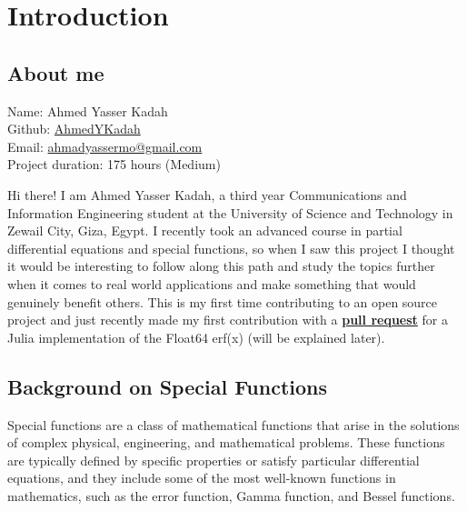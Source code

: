 \documentclass{article}
\theoremstyle{mytheoremstyle}
\theoremstyle{mytheoremstyle}
\theoremstyle{myproblemstyle}
\begin{document}
  \section*{Introduction}
    \subsection*{About me 
      \href{https://github.com/AhmedYKadah}{\faGithub}    
      \href{https://linkedin.com/in/ahmed-yasser-kadah-83687b269}{\faLinkedin}    
      \href{mailto:ahmadyassermo@gmail.com}{\faEnvelope[regular]}    
    }\label{sub:About} 
    Name: Ahmed Yasser Kadah
    \\Github: \href{https://github.com/AhmedYKadah}{AhmedYKadah}
    \\Email: \href{mailto:ahmadyassermo@gmail.com}{ahmadyassermo@gmail.com}    
    \\Project duration: 175 hours (Medium)

    \medskip
      \noindent Hi there! I am Ahmed Yasser Kadah, a third year Communications and Information Engineering student at the University of Science and Technology in Zewail City, Giza, Egypt.
      I recently took an advanced course in partial differential equations and special functions, so when I saw this project I thought it would be interesting to follow along this path and study the topics further when it comes to real world applications and make something that would genuinely benefit others. 
      This is my first time contributing to an open source project and just recently made my first contribution with a \href{https://github.com/JuliaMath/SpecialFunctions.jl/pull/491}{\textbf{pull request}} for a Julia implementation of the Float64 erf(x) (will be explained later). 





    \subsection*{Background on Special Functions}\label{sub:Background } %
    Special functions are a class of mathematical functions that arise in the solutions of complex physical, engineering, and mathematical problems.\cite{sf book, special functions}
   These functions are typically defined by specific properties or satisfy particular differential equations, and they include some of the most well-known functions in mathematics, such as the error function, Gamma function, and Bessel functions.
\end{document}
